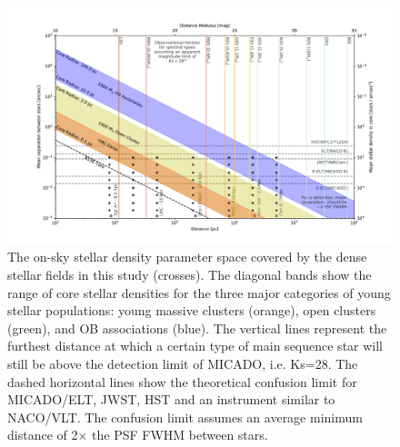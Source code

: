 \begin{figure}

    \centering
    \includegraphics[width=\textwidth]{images/resolved_stellar_densities.pdf}

    \caption{The on-sky stellar density parameter space covered by the dense stellar fields in this study (crosses). 
    The diagonal bands show the range of core stellar densities for the three major categories of young stellar populations: young massive clusters (orange), open clusters (green), and OB associations (blue). 
    The vertical lines represent the furthest distance at which a certain type of main sequence star will still be above the detection limit of MICADO, i.e. Ks=28\m.
    The dashed horizontal lines show the theoretical confusion limit for MICADO/ELT, JWST, HST and an instrument similar to NACO/VLT. The confusion limit assumes an average minimum distance of 2$\times$ the PSF FWHM between stars.
    }
    
    \label{fig:resolved_stellar_densities}
    
\end{figure}


